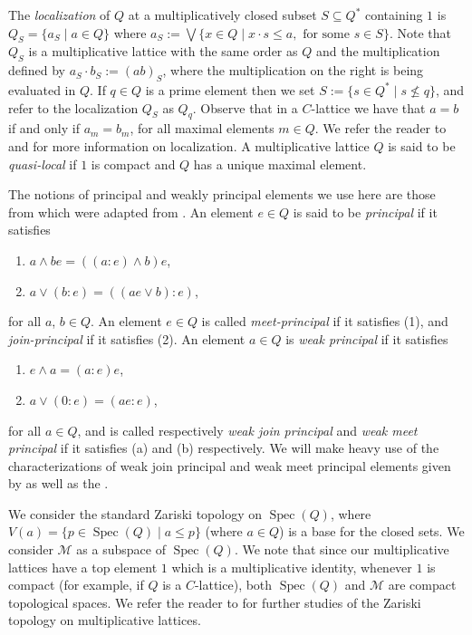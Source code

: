 \documentclass[11pt,english]{amsart}
\theoremstyle{definition}
\numberwithin{equation}{section}
\theoremstyle{remark}
\def\leq{\leqslant}
\begin{document}
    The \emph{localization} of $Q$ at a multiplicatively closed subset $S \subseteq Q^{*}$ containing $1$ is $Q_{S}=\{a_S\mid a\in Q\}$ where $a_{S}:=\bigvee\{x\in Q\mid  x\cdot s\leq a,\text{ for some } s\in S\}$. Note that $Q_S$ is a multiplicative lattice with the same order as $Q$ and the multiplication defined by $a_{S} \cdot b_{S}:= (ab)_{S}$, where the multiplication on the right is being evaluated in $Q$. If $q\in Q$ is a prime element then we set $S:=\{s\in Q^*\mid s\nleq q\}$, and refer to the localization $Q_S$ as $Q_q$. Observe that in a $C$-lattice we have that $a=b$ if and only if $a_m=b_m$, for all maximal elements $m\in Q$. We refer the reader to \cite{And-ML-1974} and \cite{Dil62} for more information on localization. A multiplicative lattice $Q$ is said to be \emph{quasi-local} if $1$ is compact and $Q$ has a unique maximal element.
	
	The notions of principal and weakly principal elements we use here are those from \cite{AJ-PE-1996} which were adapted from \cite{Dil62}. An element $e\in Q$ is said to be \emph{principal} if it satisfies  
	\begin{enumerate}
		\item $a\wedge be = ((a:e)\wedge b)e$, 
		
		\item $a\vee(b:e) =((ae\vee b):e)$,
	\end{enumerate}
	for all $a$, $b\in Q$.
	An element $e\in Q$ is called \emph{meet-principal} if it satisfies (1), and \emph{join-principal} if it satisfies (2).
	An element $a\in Q$ is \emph{weak principal}  if it satisfies 
	\begin{enumerate}
		\item[(a)] $e\wedge a = (a:e)e$,
		
		\item[(b)] $a\vee(0:e)=(ae:e)$,
	\end{enumerate}
	for all  $a\in Q$,
	and is called respectively \emph{weak join principal} and \emph{weak meet principal} if it satisfies (a) and (b) respectively.
	We will make heavy use of the characterizations of weak join principal and weak meet principal elements given by \cite[Lemma~1]{AJ-PE} as well as the \cite[Theorem~1]{AJ-PE}.
	
	We consider the standard Zariski topology on $\operatorname{Spec}(Q)$, where $V(a)=\{p\in\operatorname{Spec}(Q)\mid a\leq p\}$ (where $a\in Q$)
	is a base for the closed sets. We consider $\mathcal{M}$ as a subspace of $\operatorname{Spec}(Q)$. We note that since our multiplicative lattices have a top element $1$ which is a multiplicative identity, whenever $1$ is compact (for example, if $Q$ is a $C$-lattice), both $\operatorname{Spec}(Q)$ and $\mathcal{M}$ are compact topological spaces. We refer the reader to \cite{Facchini-AbsSpec-2021} for further studies of the Zariski topology on multiplicative lattices.  
	
\end{document}

